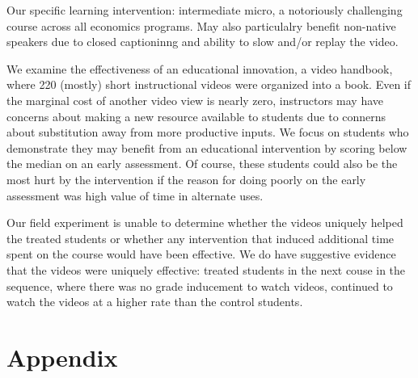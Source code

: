 \documentclass[12pt]{article}
\begin{document}
Our specific learning intervention:  intermediate micro, a notoriously challenging course across all economics programs.  May also particulalry benefit non-native speakers due to closed captioninng and ability to slow and/or replay the video.  

We examine the effectiveness of an educational innovation, a video handbook, where 220 (mostly) short instructional videos were organized into a book.  Even if the marginal cost of another video view is nearly zero, instructors may have concerns about making a new resource available to students due to connerns about substitution away from more productive inputs. We focus on students who demonstrate they may benefit from an educational intervention by scoring below the median on an early assessment.  Of course, these students could also be the most hurt by the intervention if the reason for doing poorly on the early assessment was high value of time in alternate uses.

Our field experiment is unable to determine whether the videos uniquely helped the treated students or whether any intervention that induced additional time spent on the course would have been effective.  We do have suggestive evidence that the videos were uniquely effective:  treated students in the next couse in the sequence, where there was no grade inducement to watch videos, continued to watch the videos at a higher rate than the control students.  


\printbibliography


\section{Appendix}
\end{document}
